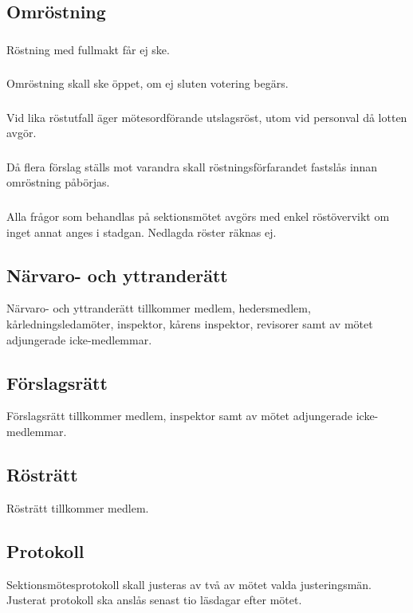 \documentclass[a4paper]{dtek}
\begin{document}
\subsection{Omröstning}
\subsubsection{}
Röstning med fullmakt får ej ske.
\subsubsection{}
Omröstning skall ske öppet, om ej sluten votering begärs.
\subsubsection{}
Vid lika röstutfall äger mötesordförande utslagsröst, utom vid personval då lotten avgör.
\subsubsection{}
Då flera förslag ställs mot varandra skall röstningsförfarandet fastslås innan omröstning påbörjas.
\subsubsection{}
Alla frågor som behandlas på sektionsmötet avgörs med enkel röstövervikt om inget annat anges i stadgan. Nedlagda röster räknas ej.
\subsection{Närvaro- och yttranderätt}
Närvaro- och yttranderätt tillkommer medlem, hedersmedlem, kårledningsledamöter, inspektor, kårens inspektor, revisorer samt av mötet adjungerade icke-medlemmar.
\subsection{Förslagsrätt}
Förslagsrätt tillkommer medlem, inspektor samt av mötet adjungerade icke-medlemmar.
\subsection{Rösträtt}
Rösträtt tillkommer medlem.
\subsection{Protokoll}
Sektionsmötesprotokoll skall justeras av två av mötet valda justeringsmän. Justerat protokoll ska anslås senast tio läsdagar efter mötet.
\newpage
\end{document}
